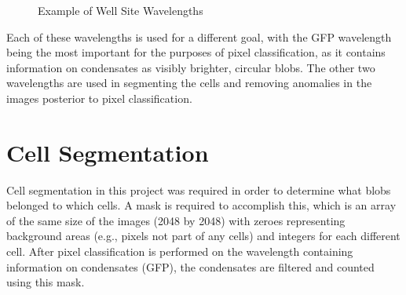 \documentclass[12pt]{article}
\begin{document}
\begin{figure}[H]
    \centering
    {
    }\caption{Example of Well Site Wavelengths}
    \label{fig:wavelengths}
\end{figure}

Each of these wavelengths is used for a different goal, with the GFP wavelength being the most 
important for the purposes of pixel classification, as it contains information on condensates
as visibly brighter, circular blobs. The other two wavelengths are used in segmenting the cells
and removing anomalies in the images posterior to pixel classification.

\section{Cell Segmentation}

Cell segmentation in this project was required in order to determine what blobs belonged to which cells. 
A mask is required to accomplish this, which is an array of the same size of the images (2048 by
2048) with zeroes representing background areas (e.g., pixels not part of any cells) and integers
for each different cell. After pixel classification is performed on the wavelength containing
information on condensates (GFP), the condensates are filtered and counted using this mask. 
\end{document}
